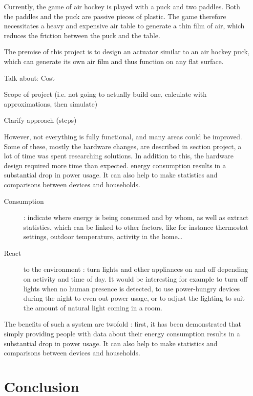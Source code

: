 Currently, the game of air hockey is played with a puck and two 
paddles.
Both the paddles and the puck are passive pieces of plastic. The game therefore
necessitates a heavy and expensive air table to generate a thin film of air,
which reduces the friction between the puck and the table.

The premise of this project is to design an actuator similar to an air hockey
puck, which can generate its own air film and thus function on any flat surface.

Talk about:
Cost

Scope of project (i.e. not going to actually build one, calculate with
approximations, then simulate)

Clarify approach (steps)

\asterbreak

However, not everything is fully functional, and many areas could be improved.
Some of these, mostly the hardware changes, are described in section
project, a lot of time was spent researching solutions. In addition to this, the
hardware design required more time than expected.
energy consumption results in a substantial drop in power usage. It can also
help to make statistics and comparisons between devices and households.

\begin{description}
  \item[Consumption] : indicate where energy is being consumed and by whom, as
    well as extract statistics, which can be linked to other factors, like for
    instance thermostat settings, outdoor temperature, activity in the
    home\ldots
  \item[React] to the environment : turn lights and other appliances on and off
    depending on activity and time of day. It would be interesting for example
    to turn off lights when no human presence is detected, to use power-hungry
    devices during the night to even out power usage, or to adjust the lighting
    to suit the amount of natural light coming in a room. 
\end{description}

The benefits of such a system are twofold : first, it has been
demonstrated\cite{darby2006} that simply providing people with data about their
energy consumption results in a substantial drop in power usage. It can also
help to make statistics and comparisons between devices and households.

\section{Conclusion}


